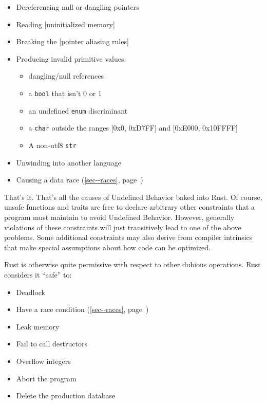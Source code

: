 \documentclass[a4paper,]{book}
\renewcommand*{\hyperref}[2][\ar]{%
  \def\ar{#2}%
  #2 (\autoref{#1}, page~\pageref{#1})}
\begin{document}
\begin{itemize}
\itemsep1pt\parskip0pt
\item
  Dereferencing null or dangling pointers
\item
  Reading {[}uninitialized memory{]}
\item
  Breaking the {[}pointer aliasing rules{]}
\item
  Producing invalid primitive values:

  \begin{itemize}
  \itemsep1pt\parskip0pt
  \item
    dangling/null references
  \item
    a \texttt{bool} that isn't 0 or 1
  \item
    an undefined \texttt{enum} discriminant
  \item
    a \texttt{char} outside the ranges {[}0x0, 0xD7FF{]} and {[}0xE000,
    0x10FFFF{]}
  \item
    A non-utf8 \texttt{str}
  \end{itemize}
\item
  Unwinding into another language
\item
  Causing a \hyperref[sec--races]{data race}
\end{itemize}

That's it. That's all the causes of Undefined Behavior baked into Rust.
Of course, unsafe functions and traits are free to declare arbitrary
other constraints that a program must maintain to avoid Undefined
Behavior. However, generally violations of these constraints will just
transitively lead to one of the above problems. Some additional
constraints may also derive from compiler intrinsics that make special
assumptions about how code can be optimized.

Rust is otherwise quite permissive with respect to other dubious
operations. Rust considers it ``safe'' to:

\begin{itemize}
\itemsep1pt\parskip0pt
\item
  Deadlock
\item
  Have a \hyperref[sec--races]{race condition}
\item
  Leak memory
\item
  Fail to call destructors
\item
  Overflow integers
\item
  Abort the program
\item
  Delete the production database
\end{itemize}
\end{document}
